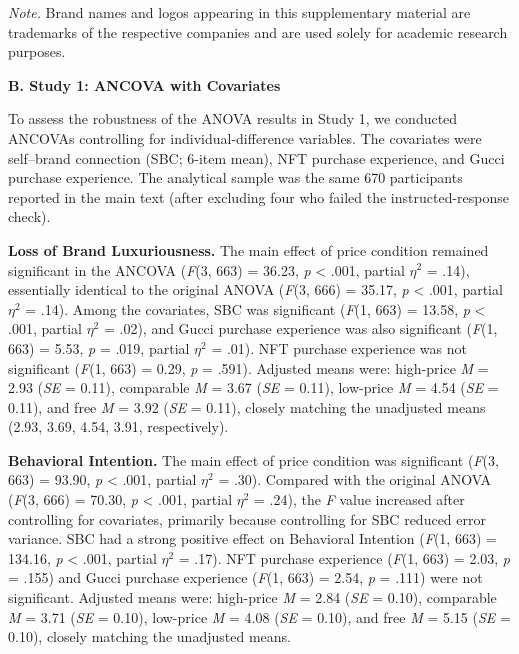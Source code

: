 \documentclass[12pt, a4paper]{article}
\makeatletter
\newcommand{\SIAnchorHeading}[2]{\clearpage\noindent \hypertarget{#1}{{\large\bfseries #2}}\par\smallskip\@afterindentfalse\@afterheading}
\makeatother
\begin{document}
\emph{Note.} Brand names and logos appearing in this supplementary material are trademarks of the respective companies and are used solely for academic research purposes.

\SIAnchorHeading{si:b}{B. Study 1: ANCOVA with Covariates}

To assess the robustness of the ANOVA results in Study 1, we conducted ANCOVAs controlling for individual-difference variables. The covariates were self--brand connection (SBC; 6-item mean), NFT purchase experience, and Gucci purchase experience. The analytical sample was the same 670 participants reported in the main text (after excluding four who failed the instructed-response check).

\noindent \textbf{Loss of Brand Luxuriousness.} The main effect of price condition remained significant in the ANCOVA (\emph{F}(3, 663) = 36.23, \emph{p} \textless{} .001, partial $\eta^2$ = .14), essentially identical to the original ANOVA (\emph{F}(3, 666) = 35.17, \emph{p} \textless{} .001, partial $\eta^2$ = .14). Among the covariates, SBC was significant (\emph{F}(1, 663) = 13.58, \emph{p} \textless{} .001, partial $\eta^2$ = .02), and Gucci purchase experience was also significant (\emph{F}(1, 663) = 5.53, \emph{p} = .019, partial $\eta^2$ = .01). NFT purchase experience was not significant (\emph{F}(1, 663) = 0.29, \emph{p} = .591). Adjusted means were: high-price \emph{M} = 2.93 (\emph{SE} = 0.11), comparable \emph{M} = 3.67 (\emph{SE} = 0.11), low-price \emph{M} = 4.54 (\emph{SE} = 0.11), and free \emph{M} = 3.92 (\emph{SE} = 0.11), closely matching the unadjusted means (2.93, 3.69, 4.54, 3.91, respectively).

\noindent \textbf{Behavioral Intention.} The main effect of price condition was significant (\emph{F}(3, 663) = 93.90, \emph{p} \textless{} .001, partial $\eta^2$ = .30). Compared with the original ANOVA (\emph{F}(3, 666) = 70.30, \emph{p} \textless{} .001, partial $\eta^2$ = .24), the \emph{F} value increased after controlling for covariates, primarily because controlling for SBC reduced error variance. SBC had a strong positive effect on Behavioral Intention (\emph{F}(1, 663) = 134.16, \emph{p} \textless{} .001, partial $\eta^2$ = .17). NFT purchase experience (\emph{F}(1, 663) = 2.03, \emph{p} = .155) and Gucci purchase experience (\emph{F}(1, 663) = 2.54, \emph{p} = .111) were not significant. Adjusted means were: high-price \emph{M} = 2.84 (\emph{SE} = 0.10), comparable \emph{M} = 3.71 (\emph{SE} = 0.10), low-price \emph{M} = 4.08 (\emph{SE} = 0.10), and free \emph{M} = 5.15 (\emph{SE} = 0.10), closely matching the unadjusted means.
\end{document}
